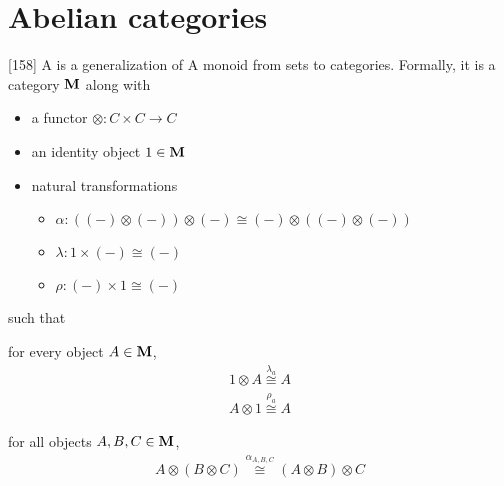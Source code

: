 \section{Abelian categories}\label{sec:abelian_categories}

\begin{definition}\label{def:monoidal_category}\cite{MacLane1994}[158]
  A  is a generalization of A monoid from sets to categories. Formally, it is a category \( \operatorname{\mathbf{M}} \) along with
  \begin{itemize}
    \item a functor \( \otimes: C \times C \to C \)
    \item an identity object \( 1 \in \operatorname{\mathbf{M}} \)
    \item natural transformations
    \begin{itemize}
      \item[] \( \alpha: ((-) \otimes (-)) \otimes (-) \cong (-) \otimes ((-) \otimes (-)) \)
      \item[] \( \lambda: 1 \times (-) \cong (-) \)
      \item[] \( \rho: (-) \times 1 \cong (-) \)
    \end{itemize}
  \end{itemize}
  such that
  \begin{defenum}
    \item for every object \( A \in \operatorname{\mathbf{M}} \),
    \begin{align*}
      1 \otimes A \overset {\lambda_a} \cong A
      \\
      A \otimes 1 \overset {\rho_a} \cong A
    \end{align*}

    \item for all objects \( A, B, C \in \operatorname{\mathbf{M}} \),
    \begin{align*}
      A \otimes (B \otimes C) \overset {\alpha_{A,B,C}} \cong (A \otimes B) \otimes C
    \end{align*}


\end{defenum}
\end{definition}
